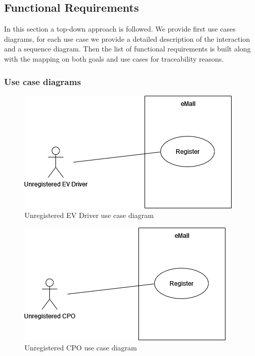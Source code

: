 \subsection{Functional Requirements}
In this section a top-down approach is followed. We provide first use cases diagrams, for each use case we provide a detailed description of the interaction and a sequence diagram. Then the list of functional requirements is built along with the mapping on both goals and use cases for traceability reasons.


\subsubsection{Use case diagrams}

\vspace*{3cm}
\begin{figure}[H]
    \centering
    \includegraphics[scale=0.6]{src/use_case_diagram/driver_registration.png}
    \caption{Unregistered EV Driver use case diagram}
\end{figure}
\vspace*{3cm}
\begin{figure}[H]
    \centering
    \includegraphics[scale=0.6]{src/use_case_diagram/cpo_registration.png}
    \caption{Unregistered CPO use case diagram}
\end{figure}


